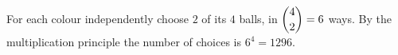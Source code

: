For each colour independently choose $2$ of its $4$ balls, in $\dbinom42=6$ ways. By the multiplication principle the number of choices is $6^4=\boxed{1296}$.

